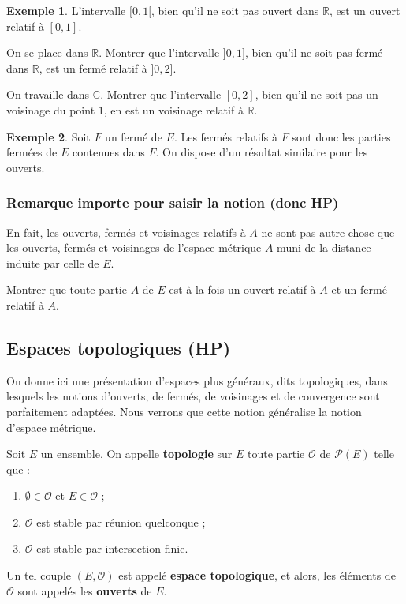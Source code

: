 \documentclass[french]{article}
\newcommand{\R}{\mathbb{R}}
\newcommand{\C}{\mathbb{C}}
\theoremstyle{plain}
\theoremstyle{definition}
\newtheorem*{ex}{Exemple}
\theoremstyle{remark}
\begin{document}
\begin{ex}
	L'intervalle $[0,1[$, bien qu'il ne soit pas ouvert dans $\R$, est un ouvert relatif à $[0,1]$.
\end{ex}

\begin{exo}
	On se place dans $\R$. Montrer que l'intervalle $]0,1]$, bien qu'il ne soit pas fermé dans $\R$, est un fermé relatif à $]0,2]$.
\end{exo}

\begin{exo}
	On travaille dans $\C$. Montrer que l'intervalle $[0,2]$, bien qu'il ne soit pas un voisinage du point $1$, en est un voisinage relatif à $\R$.
\end{exo}

\begin{ex}
	Soit $F$ un fermé de $E$. Les fermés relatifs à $F$ sont donc les parties fermées de $E$ contenues dans $F$. On dispose d'un résultat similaire pour les ouverts.
\end{ex}

\subsubsection*{Remarque importe pour saisir la notion (donc HP)}

En fait, les ouverts, fermés et voisinages relatifs à $A$ ne sont pas autre chose que les ouverts, fermés et voisinages de l'espace métrique $A$ muni de la distance induite par celle de $E$.

\begin{exo}
	Montrer que toute partie $A$ de $E$ est à la fois un ouvert relatif à $A$ et un fermé relatif à $A$.
\end{exo}

\subsection{Espaces topologiques (HP)}

On donne ici une présentation d'espaces plus généraux, dits topologiques, dans lesquels les notions d'ouverts, de fermés, de voisinages et de convergence sont parfaitement adaptées. Nous verrons que cette notion généralise la notion d'espace métrique.

\begin{dfn}
	Soit $E$ un ensemble. On appelle \textbf{topologie} sur $E$ toute partie $\mathcal{O}$ de $\mathcal{P}(E)$ telle que :
	\begin{enumerate}[label=(\roman*)]
		\item $\emptyset\in\mathcal{O}$ et $E\in\mathcal{O}$ ;
		\item $\mathcal{O}$ est stable par réunion quelconque ;
		\item $\mathcal{O}$ est stable par intersection finie.
	\end{enumerate}
	Un tel couple $(E,\mathcal{O})$ est appelé \textbf{espace topologique}, et alors, les éléments de $\mathcal{O}$ sont appelés les \textbf{ouverts} de $E$.
\end{dfn}
\end{document}
